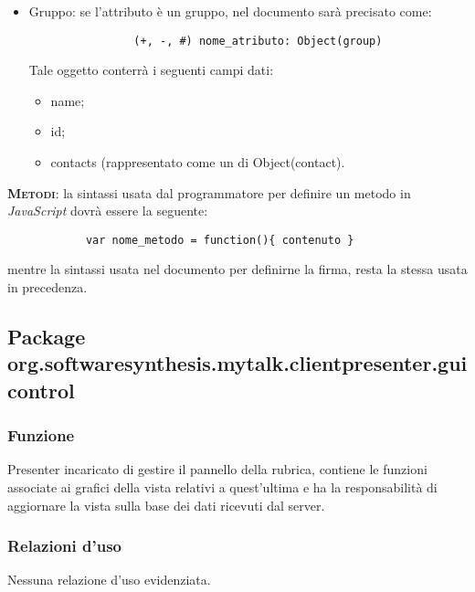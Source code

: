 \begin{description}
\begin{itemize}
\item Gruppo: se l'attributo è un gruppo, nel documento sarà precisato come:
			
			\begin{verbatim}
				(+, -, #) nome_atributo: Object(group)
			\end{verbatim}
			Tale oggetto conterrà i seguenti campi dati:
			\begin{itemize}
			\item name;
			\item id;
			\item contacts (rappresentato come un  di Object(contact).
			\end{itemize}
		\end{itemize}
	\item{\scshape\bfseries Metodi}: la sintassi usata dal programmatore per definire un metodo in \textit{JavaScript} dovrà essere la seguente:
		\begin{verbatim}
			var nome_metodo = function(){ contenuto }
		\end{verbatim}
		
		mentre la sintassi usata nel documento per definirne la firma, resta la stessa usata in precedenza.
	
\end{description}

\subsection{Package org.softwaresynthesis.mytalk.clientpresenter.guicontrol}\label{sec:guicontrol}


\subsubsection*{Funzione}
Presenter incaricato di gestire il pannello della rubrica, contiene le funzioni associate ai  grafici della vista relativi a quest'ultima e ha la responsabilità di aggiornare la vista sulla base dei dati ricevuti dal server.

\subsubsection*{Relazioni d'uso}
Nessuna relazione d'uso evidenziata.

